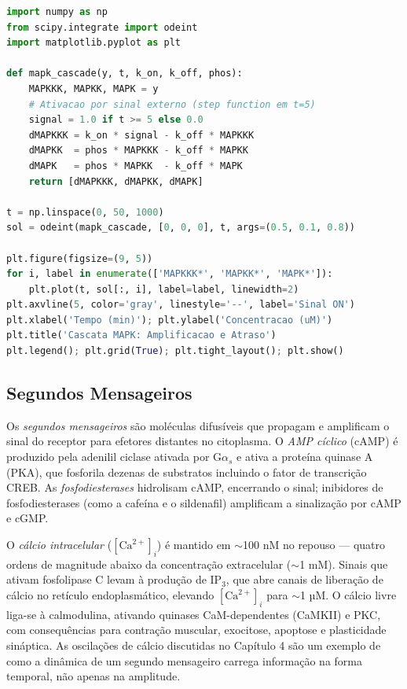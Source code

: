 \begin{lstlisting}[language=Python, caption=Modelo simplificado de cascata MAPK]
import numpy as np
from scipy.integrate import odeint
import matplotlib.pyplot as plt

def mapk_cascade(y, t, k_on, k_off, phos):
    MAPKKK, MAPKK, MAPK = y
    # Ativacao por sinal externo (step function em t=5)
    signal = 1.0 if t >= 5 else 0.0
    dMAPKKK = k_on * signal - k_off * MAPKKK
    dMAPKK  = phos * MAPKKK - k_off * MAPKK
    dMAPK   = phos * MAPKK  - k_off * MAPK
    return [dMAPKKK, dMAPKK, dMAPK]

t = np.linspace(0, 50, 1000)
sol = odeint(mapk_cascade, [0, 0, 0], t, args=(0.5, 0.1, 0.8))

plt.figure(figsize=(9, 5))
for i, label in enumerate(['MAPKKK*', 'MAPKK*', 'MAPK*']):
    plt.plot(t, sol[:, i], label=label, linewidth=2)
plt.axvline(5, color='gray', linestyle='--', label='Sinal ON')
plt.xlabel('Tempo (min)'); plt.ylabel('Concentracao (uM)')
plt.title('Cascata MAPK: Amplificacao e Atraso')
plt.legend(); plt.grid(True); plt.tight_layout(); plt.show()
\end{lstlisting}

\subsection{Segundos Mensageiros}

Os \emph{segundos mensageiros} são moléculas difusíveis que propagam e amplificam o sinal
do receptor para efetores distantes no citoplasma. O \emph{AMP cíclico} (cAMP) é
produzido pela adenilil ciclase ativada por G$\alpha_s$ e ativa a proteína quinase A (PKA),
que fosforila dezenas de substratos incluindo o fator de transcrição CREB. As
\emph{fosfodiesterases} hidrolisam cAMP, encerrando o sinal; inibidores de
fosfodiesterases (como a cafeína e o sildenafil) amplificam a sinalização por cAMP e cGMP.

O \emph{cálcio intracelular} ($[\text{Ca}^{2+}]_i$) é mantido em $\sim$100 nM no repouso
--- quatro ordens de magnitude abaixo da concentração extracelular ($\sim$1 mM). Sinais
que ativam fosfolipase C levam à produção de IP$_3$, que abre canais de liberação de
cálcio no retículo endoplasmático, elevando $[\text{Ca}^{2+}]_i$ para $\sim$1 µM. O
cálcio livre liga-se à calmodulina, ativando quinases CaM-dependentes (CaMKII) e PKC, com
consequências para contração muscular, exocitose, apoptose e plasticidade sináptica. As
oscilações de cálcio discutidas no Capítulo 4 são um exemplo de como a dinâmica de um
segundo mensageiro carrega informação na forma temporal, não apenas na amplitude.


